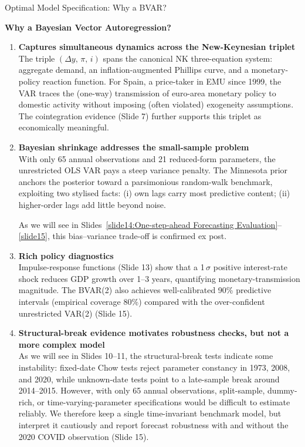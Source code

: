 \documentclass[9pt]{beamer}
\begin{document}
\begin{frame}{Optimal Model Specification: Why a BVAR?}

\textbf{\footnotesize Why a Bayesian Vector Autoregression?}

\scriptsize
\begin{enumerate}
  \item \textbf{Captures simultaneous dynamics across the New-Keynesian triplet}\\
        The triple $(\Delta y,\,\pi,\,i)$ spans the canonical NK three-equation system: aggregate demand, an inflation-augmented Phillips curve, and a monetary-policy reaction function. For Spain, a price-taker in EMU since 1999, the VAR traces the (one-way) transmission of euro-area monetary policy to domestic activity without imposing (often violated) exogeneity assumptions. The cointegration evidence (Slide 7) further supports this triplet as economically meaningful.

  \item \textbf{Bayesian shrinkage addresses the small-sample problem}\\
        With only 65 annual observations and 21 reduced-form parameters, the unrestricted OLS VAR pays a steep variance penalty. The Minnesota prior anchors the posterior toward a parsimonious random-walk benchmark, exploiting two stylised facts: (i) own lags carry most predictive content; (ii) higher-order lags add little beyond noise.
        
        As we will see in Slides~\ref{slide14:One-step-ahead Forecasting Evaluation}--\ref{slide15}, this bias--variance trade-off is confirmed ex post.

  \item \textbf{Rich policy diagnostics}\\
        Impulse-response functions (Slide 13) show that a 1\,$\sigma$ positive interest-rate shock reduces GDP growth over 1--3 years, quantifying monetary-transmission magnitude. The BVAR(2) also achieves well-calibrated 90\% predictive intervals (empirical coverage 80\%) compared with the over-confident unrestricted VAR(2) (Slide 15).

  \item \textbf{Structural-break evidence motivates robustness checks, but not a more complex model}\\
        As we will see in Slides 10–11, the structural-break tests indicate some instability: fixed-date Chow tests reject parameter constancy in 1973, 2008, and 2020, while unknown-date tests point to a late-sample break around 2014–2015. However, with only 65 annual observations, split-sample, dummy-rich, or time-varying-parameter specifications would be difficult to estimate reliably. We therefore keep a single time-invariant benchmark model, but interpret it cautiously and report forecast robustness with and without the 2020 COVID observation (Slide 15).
\end{enumerate}

\end{frame}
\end{document}
